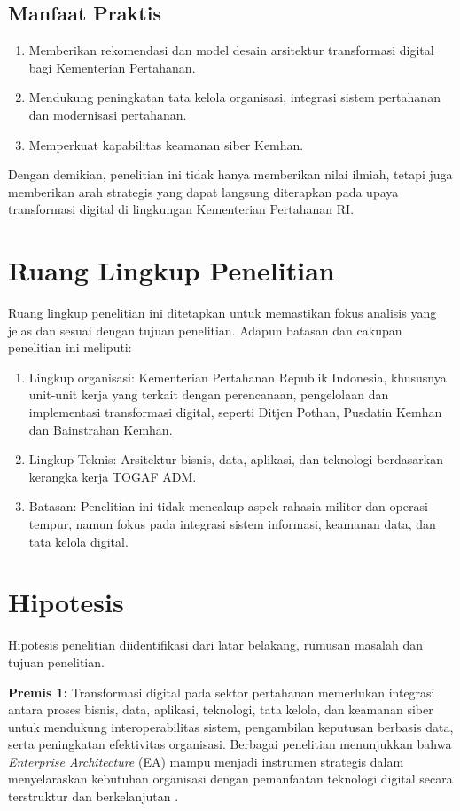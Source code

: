 \subsection{Manfaat Praktis}
\begin{enumerate}
    \item Memberikan rekomendasi dan model desain arsitektur transformasi digital bagi Kementerian Pertahanan.
    \item Mendukung peningkatan tata kelola organisasi, integrasi sistem pertahanan dan modernisasi pertahanan.
    \item Memperkuat kapabilitas keamanan siber Kemhan.
\end{enumerate}
Dengan demikian, penelitian ini tidak hanya memberikan nilai ilmiah, tetapi juga memberikan arah strategis yang dapat langsung diterapkan
pada upaya transformasi digital di lingkungan Kementerian Pertahanan RI.

\section{Ruang Lingkup Penelitian}
Ruang lingkup penelitian ini ditetapkan untuk memastikan fokus analisis yang jelas dan sesuai dengan tujuan penelitian.
Adapun batasan dan cakupan penelitian ini meliputi:
\begin{enumerate}
    \item Lingkup organisasi: Kementerian Pertahanan Republik Indonesia, khususnya unit-unit kerja yang terkait dengan perencanaan,
    pengelolaan dan implementasi transformasi digital, seperti Ditjen Pothan, Pusdatin Kemhan dan Bainstrahan Kemhan.
    \item Lingkup Teknis: Arsitektur bisnis, data, aplikasi, dan teknologi berdasarkan kerangka kerja TOGAF ADM.
    \item Batasan: Penelitian ini tidak mencakup aspek rahasia militer dan operasi tempur, namun fokus pada integrasi sistem informasi, keamanan data, dan tata kelola digital.
\end{enumerate}

\section{Hipotesis}
Hipotesis penelitian diidentifikasi dari latar belakang, rumusan masalah dan tujuan penelitian.

\textbf{Premis 1:} Transformasi digital pada sektor pertahanan memerlukan integrasi antara proses bisnis, data, aplikasi, teknologi, tata kelola, dan keamanan siber untuk mendukung interoperabilitas sistem, pengambilan keputusan berbasis data, serta peningkatan efektivitas organisasi.
Berbagai penelitian menunjukkan bahwa \textit{Enterprise Architecture} (EA) mampu menjadi instrumen strategis dalam menyelaraskan kebutuhan organisasi dengan pemanfaatan teknologi digital secara terstruktur dan berkelanjutan \autocite{Syamfithriani,Mattila2022}.

